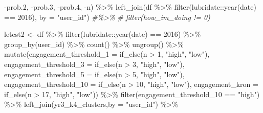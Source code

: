 \documentclass[
]{article}
\newenvironment{Shaded}{\begin{snugshade}}{\end{snugshade}}
\newcommand{\AttributeTok}[1]{\textcolor[rgb]{0.77,0.63,0.00}{#1}}
\newcommand{\CommentTok}[1]{\textcolor[rgb]{0.56,0.35,0.01}{\textit{#1}}}
\newcommand{\DecValTok}[1]{\textcolor[rgb]{0.00,0.00,0.81}{#1}}
\newcommand{\FloatTok}[1]{\textcolor[rgb]{0.00,0.00,0.81}{#1}}
\newcommand{\FunctionTok}[1]{\textcolor[rgb]{0.00,0.00,0.00}{#1}}
\newcommand{\NormalTok}[1]{#1}
\newcommand{\OtherTok}[1]{\textcolor[rgb]{0.56,0.35,0.01}{#1}}
\newcommand{\SpecialCharTok}[1]{\textcolor[rgb]{0.00,0.00,0.00}{#1}}
\newcommand{\StringTok}[1]{\textcolor[rgb]{0.31,0.60,0.02}{#1}}
\begin{document}
\begin{Shaded}
\begin{Highlighting}[]
          \SpecialCharTok{{-}}\NormalTok{prob}\FloatTok{.2}\NormalTok{,}
          \SpecialCharTok{{-}}\NormalTok{prob}\FloatTok{.3}\NormalTok{,}
          \SpecialCharTok{{-}}\NormalTok{prob}\FloatTok{.4}\NormalTok{,}
          \SpecialCharTok{{-}}\NormalTok{n) }\SpecialCharTok{\%\textgreater{}\%} 
  \FunctionTok{left\_join}\NormalTok{(df }\SpecialCharTok{\%\textgreater{}\%}
  \FunctionTok{filter}\NormalTok{(lubridate}\SpecialCharTok{::}\FunctionTok{year}\NormalTok{(date) }\SpecialCharTok{==} \DecValTok{2016}\NormalTok{),}
         \AttributeTok{by =} \StringTok{"user\_id"}\NormalTok{)}
\CommentTok{\#\%\textgreater{}\%}
\CommentTok{\#  filter(how\_im\_doing != 0)}


\NormalTok{letest2 }\OtherTok{\textless{}{-}}\NormalTok{  df }\SpecialCharTok{\%\textgreater{}\%}
  \FunctionTok{filter}\NormalTok{(lubridate}\SpecialCharTok{::}\FunctionTok{year}\NormalTok{(date) }\SpecialCharTok{==} \DecValTok{2016}\NormalTok{) }\SpecialCharTok{\%\textgreater{}\%}
  \FunctionTok{group\_by}\NormalTok{(user\_id) }\SpecialCharTok{\%\textgreater{}\%}
  \FunctionTok{count}\NormalTok{() }\SpecialCharTok{\%\textgreater{}\%}
  \FunctionTok{ungroup}\NormalTok{() }\SpecialCharTok{\%\textgreater{}\%} 
  \FunctionTok{mutate}\NormalTok{(}\AttributeTok{engagement\_threshold\_1 =} \FunctionTok{if\_else}\NormalTok{(n }\SpecialCharTok{\textgreater{}} \DecValTok{1}\NormalTok{, }\StringTok{"high"}\NormalTok{, }\StringTok{"low"}\NormalTok{),}
         \AttributeTok{engagement\_threshold\_3 =} \FunctionTok{if\_else}\NormalTok{(n }\SpecialCharTok{\textgreater{}} \DecValTok{3}\NormalTok{, }\StringTok{"high"}\NormalTok{, }\StringTok{"low"}\NormalTok{),}
         \AttributeTok{engagement\_threshold\_5 =} \FunctionTok{if\_else}\NormalTok{(n }\SpecialCharTok{\textgreater{}} \DecValTok{5}\NormalTok{, }\StringTok{"high"}\NormalTok{, }\StringTok{"low"}\NormalTok{),}
         \AttributeTok{engagement\_threshold\_10 =} \FunctionTok{if\_else}\NormalTok{(n }\SpecialCharTok{\textgreater{}} \DecValTok{10}\NormalTok{, }\StringTok{"high"}\NormalTok{, }\StringTok{"low"}\NormalTok{),}
         \AttributeTok{engagement\_kron =} \FunctionTok{if\_else}\NormalTok{(n }\SpecialCharTok{\textgreater{}} \DecValTok{17}\NormalTok{, }\StringTok{"high"}\NormalTok{, }\StringTok{"low"}\NormalTok{)) }\SpecialCharTok{\%\textgreater{}\%} 
  \FunctionTok{filter}\NormalTok{(engagement\_threshold\_10 }\SpecialCharTok{==} \StringTok{"high"}\NormalTok{) }\SpecialCharTok{\%\textgreater{}\%} 
  \FunctionTok{left\_join}\NormalTok{(yr3\_k4\_clusters,}\AttributeTok{by =} \StringTok{"user\_id"}\NormalTok{) }\SpecialCharTok{\%\textgreater{}\%} 

\end{Highlighting}
\end{Shaded}
\end{document}
